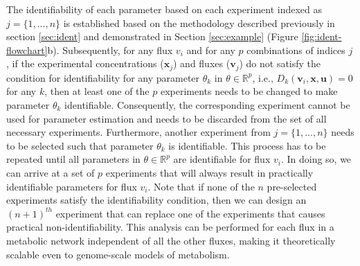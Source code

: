 \documentclass[10pt]{article}
\begin{document}
	The identifiability of each parameter based on each experiment indexed as $j = \{1, ..., n\}$ is established based on the methodology described previously in section \ref{sec:ident} and demonstrated in Section \ref{sec:example} (Figure \ref{fig:ident-flowchart}b). Subsequently, for any flux $v_i$ and for any $p$ combinations of indices $j$, if the experimental concentrations ($\mathbf{x}_j$) and fluxes ($\mathbf{v}_j$) do not satisfy the condition for identifiability for any parameter $\theta_k$ in $\theta\in\mathbb{R}^p$, i.e., $D_k(\mathbf{v}_i, \mathbf{x}, \mathbf{u}) = 0$ for any $k$, then at least one of the $p$ experiments needs to be changed to make parameter $\theta_k$ identifiable. Consequently, the corresponding experiment cannot be used for parameter estimation and needs to be discarded from the set of all necessary experiments. Furthermore, another experiment from $j = \{1, ..., n\}$ needs to be selected such that parameter $\theta_k$ is identifiable. This process has to be repeated until all parameters in $\theta\in\mathbb{R}^p$ are identifiable for flux $v_i$. In doing so, we can arrive at a set of $p$ experiments that will always result in practically identifiable parameters for flux $v_i$. Note that if none of the $n$ pre-selected experiments satisfy the identifiability condition, then we can design an $(n+1)^{th}$ experiment that can replace one of the experiments that causes practical non-identifiability. This analysis can be performed for each flux in a metabolic network independent of all the other fluxes, making it theoretically scalable even to genome-scale models of metabolism. 	
	
\end{document}
